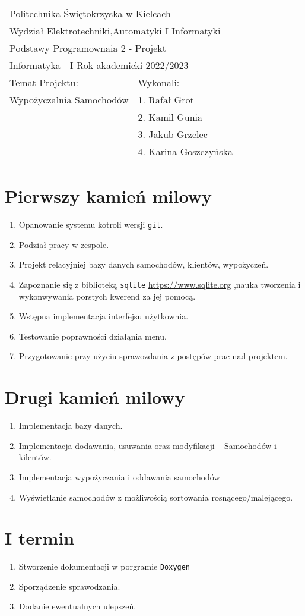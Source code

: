 \documentclass[11pt]{article}
\author{placeholder}
\date{\today}
\title{}
\begin{document}
\begin{center}
\begin{tabular}{|l|l|}
\hline
\multicolumn{2}{|l|}{Politechnika Świętokrzyska w Kielcach} \\
\multicolumn{2}{|l|}{Wydział Elektrotechniki,Automatyki I Informatyki} \\
\hline
\multicolumn{2}{|l|}{Podstawy Programownaia 2 - Projekt} \\
\multicolumn{2}{|l|}{Informatyka - I Rok akademicki 2022/2023} \\
\hline
Temat Projektu: & Wykonali: \\
Wypożyczalnia Samochodów & 1. Rafał Grot \\
 & 2. Kamil Gunia \\
 & 3. Jakub Grzelec \\
 & 4. Karina Goszczyńska \\
\hline
\end{tabular}
\end{center}
\section{Pierwszy kamień milowy}
\label{sec:orgc3ea790}
\begin{enumerate}
\item Opanowanie systemu kotroli wersji \texttt{git}.
\item Podział pracy w zespole.
\item Projekt relacyjniej bazy danych samochodów, klientów, wypożyczeń.
\item Zapoznanie się z biblioteką \texttt{sqlite} \url{https://www.sqlite.org} ,nauka tworzenia i wykonwywania porstych kwerend za jej pomocą.
\item Wstępna implementacja interfejsu użytkownia.
\item Testowanie poprawności działąnia menu.
\item Przygotowanie przy użyciu sprawozdania z postępów prac nad projektem.
\end{enumerate}
\section{Drugi kamień milowy}
\label{sec:orgf850504}
\begin{enumerate}
\item Implementacja bazy danych.
\item Implementacja dodawania, usuwania oraz modyfikacji -- Samochodów i kilentów.
\item Implementacja wypożyczania i oddawania samochodów
\item Wyświetlanie samochodów z możliwością sortowania rosnącego/malejącego.
\end{enumerate}
\section{I termin}
\label{sec:org6ec6008}
\begin{enumerate}
\item Stworzenie dokumentacji w porgramie \texttt{Doxygen}
\item Sporządzenie sprawodzania.
\item Dodanie ewentualnych ulepszeń.
\end{enumerate}
\end{document}
